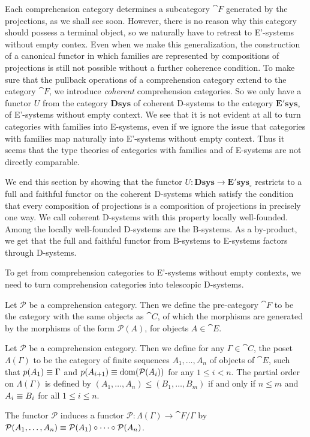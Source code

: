 Each comprehension category determines a subcategory $\cat{F}$ generated by
the projections, as we shall see soon. However, there is no reason why
this category should possess a terminal object, so we naturally have to retreat
to E'-systems without empty contex. Even when we make this generalization, 
the construction of a canonical functor in which families are represented by 
compositions of projections is still not possible without a further coherence 
condition. To make sure that
the pullback operations of a comprehension category extend to the category
$\cat{F}$, we introduce \emph{coherent} comprehension categories. So we only have a functor $U$
from the category $\mathbf{Dsys}$ of coherent D-systems to the category
$\mathbf{E'sys_{\circ}}$ of E'-systems without empty context.
We see that it is not evident at all to turn categories with families into
E-systems, even if we ignore the issue that categories with families map
naturally into E'-systems without empty context.
Thus it seems that the type theories of categories with families and of E-systems
are not directly comparable.

We end this section by showing that the functor 
$U:\mathbf{Dsys}\to\mathbf{E'sys_{\circ}}$ restricts to a full and faithful 
functor on the coherent D-systems which satisfy the condition that every 
composition of projections is a composition of projections in precisely one way.
We call coherent D-systems with this property
locally well-founded. Among the locally well-founded D-systems are the B-systems.
As a by-product, we get that the full and faithful functor from B-systems to
E-systems factors through D-systems. 

To get from comprehension categories to E'-systems without empty contexts, we
need to turn comprehension categories into telescopic D-systems. 

\begin{defn}
Let $\mathcal{P}$ be a comprehension category. Then we define the pre-category
$\cat{F}$ to be the category with the same objects as $\cat{C}$, of which the
morphisms are generated by the morphisms of the form $\mathcal{P}(A)$, for objects
$A\in\cat{E}$. 
\end{defn}

\begin{defn}
Let $\mathcal{P}$ be a comprehension category. Then we define for any 
$\Gamma\in\cat{C}$, the poset $\Lambda(\Gamma)$ to be the category of finite 
sequences  $A_1,\ldots,A_n$ of objects of $\cat{E}$, such that 
$p(A_1)\equiv\Gamma$ and $p(A_{i+1})\equiv\mathrm{dom}(\mathcal{P}(A_i))$ 
for any $1\leq i < n$. The partial order on 
$\Lambda(\Gamma)$ is defined by $(A_1,\ldots,A_n)\leq (B_1,\ldots,B_m)$ if and 
only if $n\leq m$ and $A_i\equiv B_i$ for all $1\leq i\leq n$.

The functor $\mathcal{P}$ induces a functor $\mathcal{P}:\Lambda(\Gamma)\to
\cat{F}/\Gamma$ by $\mathcal{P}(A_1,\ldots,A_n)\equiv\mathcal{P}(A_1)\circ
\cdots\circ\mathcal{P}(A_n)$.
\end{defn}

